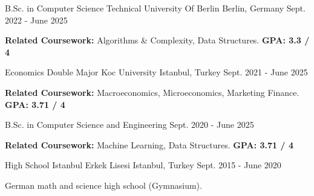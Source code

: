 
\begin{cventries}
  \cventry
    {B.Sc. in Computer Science}
    {Technical University Of Berlin}
    {Berlin, Germany}
    {Sept. 2022 - June 2025}
    {
      \begin{cvitems}
      \item {\textbf{Related Coursework: }Algorithms \& Complexity, Data Structures. \textbf{GPA: 3.3 / 4}}
      \end{cvitems}
    }

  \cventry
    {Economics Double Major}
    {Koc University}
    {Istanbul, Turkey}
    {Sept. 2021 - June 2025}
    {
      \begin{cvitems}
      \item {\textbf{Related Coursework:} Macroeconomics, Microeconomics, Marketing Finance. \textbf{GPA: 3.71 / 4}}
      \end{cvitems}
    }

  \cventry
    {B.Sc. in Computer Science and Engineering}
    {}
    {}
    {Sept. 2020 - June 2025}
    {
      \begin{cvitems}
        \item {\textbf{Related Coursework:} Machine Learning, Data Structures. \textbf{GPA: 3.71 / 4}}
      \end{cvitems}
    }

  \cventry
    {High School}
    {Istanbul Erkek Lisesi}
    {Istanbul, Turkey}
    {Sept. 2015 - June 2020}
    {
      \begin{cvitems}
      \item {German math and science high school (Gymnasium).}
      \end{cvitems}
    }

\end{cventries}
